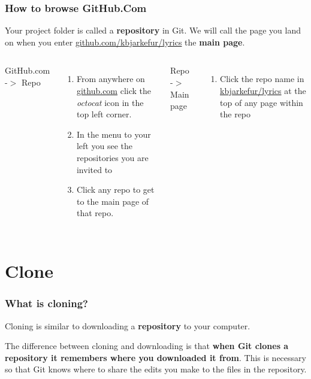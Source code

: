 \documentclass[aspectratio=169]{beamer} %
\newcommand{\trainingURL}[1]{{\color{blue}\url{#1}}}
\newcommand{\traininerUsername}{kbjarkefur}
\newcommand{\repoName}{\traininerUsername/lyrics}
\newcommand{\trainingRepoURL}[1]{\trainingURL{github.com/\repoName #1}}
\begin{document}
\begin{frame}
\frametitle{How to browse GitHub.Com}

	Your project folder is called a \textbf{repository} in Git. We will call the page you land on when you enter \trainingRepoURL{} the \textbf{main page}.

	\vspace{.5cm}

	\begin{columns}[T]

		GitHub.com -$>$ Repo
		\begin{enumerate}
			\item From anywhere on \trainingURL{github.com} click the \textit{octocat} icon in the top left corner.
			\item In the menu to your left you see the repositories you are invited to
			\item Click any repo to get to the main page of that repo.
		\end{enumerate}

		Repo -$>$ Main page
		\begin{enumerate}
			\item Click the repo name in {\color{blue}\url{\repoName}} at the top of any page within the repo
		\end{enumerate}

	\end{columns}
\end{frame}

\section{Clone}

\begin{frame}
\frametitle{What is cloning?}

	Cloning is similar to downloading a \textbf{repository} to your computer.

	\vspace{.5cm}

	The difference between cloning and downloading is that \textbf{when Git clones a repository it remembers where you downloaded it from}. This is necessary so that Git knows where to share the edits you make to the files in the repository.

\end{frame}
\end{document}
